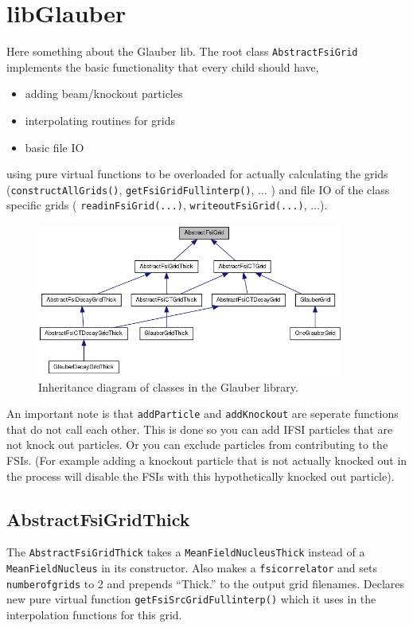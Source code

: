 \section{libGlauber}
Here something about the Glauber lib. The root class \texttt{AbstractFsiGrid} implements the basic functionality that every child should have,
\begin{itemize}
	\item adding beam/knockout particles 
	\item interpolating routines for grids
	\item basic file IO
\end{itemize}
using pure virtual functions to be overloaded for actually calculating the grids (\texttt{constructAllGrids()},
\texttt{getFsiGridFull\textunderscore interp()}, $\ldots$ ) and file IO of the class specific grids ( \texttt{readinFsiGrid(...)},
\texttt{writeoutFsiGrid(...)}, $\ldots$).
\begin{figure}
\centering
\includegraphics[width=0.9\textwidth]{figs/classAbstractFsiGrid__inherit__graph.png}
\caption{Inheritance diagram of classes in the Glauber library. }
\label{fig:AbstractFsiGrid__inherit__graph}
\end{figure}

An important note is that \texttt{addParticle} and \texttt{addKnockout} are seperate functions that do not call each other. This is done so you can add IFSI particles that are not knock out particles. Or you can exclude particles from contributing to the FSIs. (For example adding a knockout particle that is not actually knocked out in the process will disable the FSIs with this hypothetically knocked out particle).
\subsection{AbstractFsiGridThick}
The \texttt{AbstractFsiGridThick} takes a \texttt{MeanFieldNucleusThick} instead of a \texttt{MeanFieldNucleus} in its constructor. Also makes a \texttt{fsicorrelator} and sets \texttt{number\textunderscore of\textunderscore grids} to 2 and prepends ``Thick.'' to the output grid filenames.
Declares new pure virtual function \texttt{getFsiSrcGridFull\textunderscore interp()} which it uses in the interpolation functions for this grid.

